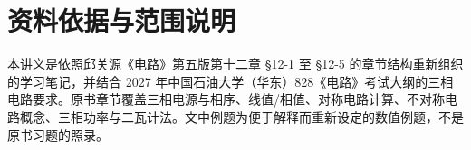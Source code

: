 \documentclass[circuit]{CarlosTexRpt}
\begin{document}
\section*{资料依据与范围说明}
本讲义是依照邱关源《电路》第五版第十二章 \S12-1 至 \S12-5 的章节结构重新组织的学习笔记，并结合 2027 年中国石油大学（华东）828《电路》考试大纲的三相电路要求。原书章节覆盖三相电源与相序、线值/相值、对称电路计算、不对称电路概念、三相功率与二瓦计法。文中例题为便于解释而重新设定的数值例题，不是原书习题的照录。
\end{document}

